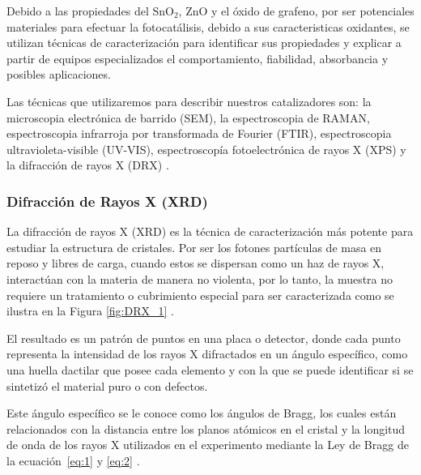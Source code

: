 \documentclass[12pt]{article}
\begin{document}
    Debido a las propiedades del SnO$\displaystyle _{2}$, ZnO y el óxido de grafeno, por ser potenciales materiales para efectuar la fotocatálisis, debido a sus caracteristicas oxidantes, se utilizan técnicas de caracterización para identificar sus propiedades y explicar a partir de equipos especializados el comportamiento, fiabilidad, absorbancia y posibles aplicaciones.\vspace{1em} %
    
    Las técnicas que utilizaremos para describir nuestros catalizadores son: la microscopia electrónica de barrido (SEM), la espectroscopia de RAMAN, espectroscopia infrarroja por transformada de Fourier (FTIR), espectroscopia ultravioleta-visible (UV-VIS), espectroscopía fotoelectrónica de rayos X (XPS) y la difracción de rayos X (DRX) \cite{IEEEreferencias:Ref15}.
    
        \subsubsection{Difracción de Rayos X (XRD)}
        La difracción de rayos X (XRD) es la técnica de caracterización más potente para estudiar la estructura de cristales. Por ser los fotones partículas de masa en reposo y libres de carga, cuando estos se dispersan como un haz de rayos X, interactúan con la materia de manera no violenta, por lo tanto, la muestra no requiere un tratamiento o cubrimiento especial para ser caracterizada como se ilustra en la Figura \ref{fig:DRX_1} \cite{IEEEreferencias:Ref17}.\vspace{1em} %

        El resultado es un patrón de puntos en una placa o detector, donde cada punto representa la intensidad de los rayos X difractados en un ángulo específico, como una huella dactilar que posee cada elemento y con la que se puede identificar si se sintetizó el material puro o con defectos.\vspace{1em} %
        
        Este ángulo específico se le conoce como los ángulos de Bragg, los cuales están relacionados con la distancia entre los planos atómicos en el cristal y la longitud de onda de los rayos X utilizados en el experimento mediante la Ley de Bragg de la ecuación~\ref{eq:1} y \ref{eq:2} \cite{IEEEreferencias:Bragg}.\vspace{1em} %
\end{document}
